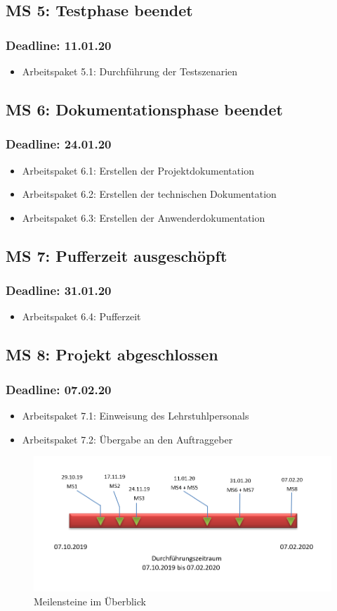 \subsection*{MS 5: Testphase beendet}
\subsubsection*{Deadline: 11.01.20}
\begin{itemize}
\item Arbeitspaket 5.1: Durchführung der Testszenarien
\end{itemize}

\subsection*{MS 6: Dokumentationsphase beendet}
\subsubsection*{Deadline: 24.01.20}
\begin{itemize}
\item Arbeitspaket 6.1: Erstellen der Projektdokumentation
\item Arbeitspaket 6.2: Erstellen der technischen Dokumentation
\item Arbeitspaket 6.3: Erstellen der Anwenderdokumentation
\end{itemize}

\subsection*{MS 7: Pufferzeit ausgeschöpft}
\subsubsection*{Deadline: 31.01.20}
\begin{itemize}
\item Arbeitspaket 6.4: Pufferzeit
\end{itemize}

\subsection*{MS 8: Projekt abgeschlossen}
\subsubsection*{Deadline: 07.02.20}
\begin{itemize}
\item Arbeitspaket 7.1: Einweisung des Lehrstuhlpersonals
\item Arbeitspaket 7.2: Übergabe an den Auftraggeber
\end{itemize}

\begin{figure}[h]
\centering
\includegraphics[scale=1]{bilder/Meilensteinplan.png}
\caption*{Meilensteine im Überblick}
\end{figure}